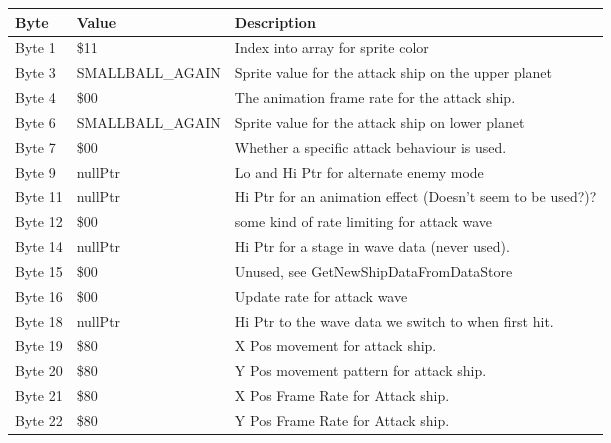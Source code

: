 \begin{figure}[H]
{\begin{adjustbox}{width=12cm}
\begin{tabular}{lll}
\toprule
 Byte    & Value                      & Description                                                        \\
\midrule
 Byte 1  & \$11                        & Index into array for sprite color                                  \\
 Byte 3  & SMALLBALL\_AGAIN            & Sprite value for the attack ship on the upper planet               \\
 Byte 4  & \$00                        & The animation frame rate for the attack ship.                      \\
 Byte 6  & SMALLBALL\_AGAIN            & Sprite value for the attack ship on lower planet                   \\
 Byte 7  & \$00                        & Whether a specific attack behaviour is used.                       \\
 Byte 9  & nullPtr                    & Lo and Hi Ptr for alternate enemy mode                             \\
 Byte 11 & nullPtr                    & Hi Ptr for an animation effect (Doesn't seem to be used?)?         \\
 Byte 12 & \$00                        & some kind of rate limiting for attack wave                         \\
 Byte 14 & nullPtr                    & Hi Ptr for a stage in wave data (never used).                      \\
 Byte 15 & \$00                        & Unused, see GetNewShipDataFromDataStore                            \\
 Byte 16 & \$00                        & Update rate for attack wave                                        \\
 Byte 18 & nullPtr                    & Hi Ptr to the wave data we switch to when first hit.               \\
 Byte 19 & \$80                        & X Pos movement for attack ship.                                    \\
 Byte 20 & \$80                        & Y Pos movement pattern for attack ship.                            \\
 Byte 21 & \$80                        & X Pos Frame Rate for Attack ship.                                  \\
 Byte 22 & \$80                        & Y Pos Frame Rate for Attack ship.                                  \\

\end{tabular}
\end{adjustbox}}
\end{figure}
